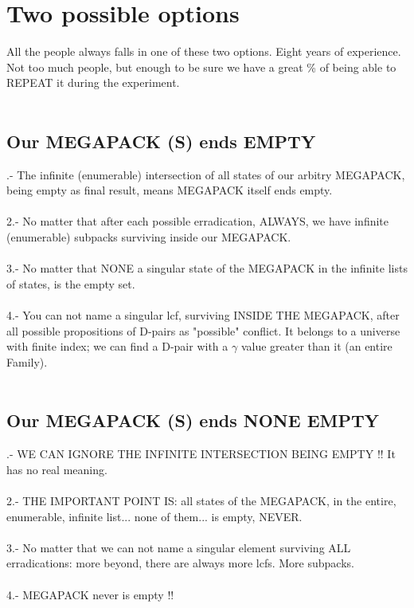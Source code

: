 \chapter{Two possible options}
	
	\noindent
	All the people always falls in one of these two options. Eight years of experience. Not too much people, but enough to be sure we have a great \% of being able to REPEAT it during the experiment.
	\\\\

	\section{Our MEGAPACK (S) ends EMPTY}
	
		.- The infinite (enumerable) intersection of all states of our arbitry MEGAPACK, being empty as final result, means MEGAPACK itself ends empty.\\\\
		2.- No matter that after each possible erradication, ALWAYS, we have infinite (enumerable) subpacks surviving inside our MEGAPACK.\\\\
		3.- No matter that NONE a singular state of the MEGAPACK in the infinite lists of states, is the empty set.\\\\
		4.- You can not name a singular lcf, surviving INSIDE THE MEGAPACK, after all possible propositions of D-pairs as "possible" conflict. It belongs to a universe with finite index; we can find a D-pair with a $\gamma$ value greater than it (an entire Family).
		\\\\
		
	
	\section{Our MEGAPACK (S) ends NONE EMPTY}
	
		.- WE CAN IGNORE THE INFINITE INTERSECTION BEING EMPTY !! It has no real meaning.\\\\
		2.- THE IMPORTANT POINT IS: all states of the MEGAPACK, in the entire, enumerable, infinite list... none of them... is empty, NEVER.\\\\
		3.- No matter that we can not name a singular element surviving ALL erradications: more beyond, there are always more lcfs. More subpacks.\\\\
		4.- MEGAPACK never is empty !!
		\\\\
		
